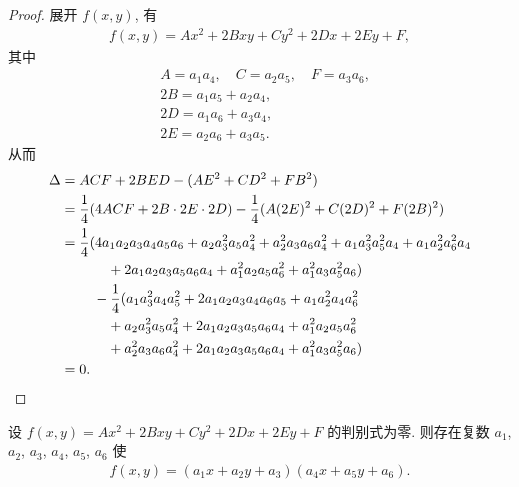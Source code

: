 \documentclass[%
    UTF8,%
    fontset=none,%
    punct=kaiming,%
    zihao=-4,%
    a4paper,%
    oneside,%
]{ctexbook}
\begin{document}
\begin{proof}
    展开 \(f(x, y)\), 有
    \begin{align*}
        f(x,y) = A x^2 + 2B xy + C y^2 + 2D x + 2E y + F,
    \end{align*}
    其中
    \begin{align*}
         & A = a_1 a_4, \quad C = a_2 a_5, \quad F = a_3 a_6, \\
         & 2B = a_1 a_5 + a_2 a_4,                            \\
         & 2D = a_1 a_6 + a_3 a_4,                            \\
         & 2E = a_2 a_6 + a_3 a_5.
    \end{align*}
    从而
    \begin{align*}
        \Delta
        = {} & ACF + 2BED - (AE^2 + CD^2 + FB^2)                                                                                        \\
        = {} & \frac{1}{4} (4ACF + 2B \cdot 2E \cdot 2D) - \frac{1}{4} (A (2E)^2 + C (2D)^2 + F(2B)^2)                                  \\
        = {} & \frac{1}{4} (4 a_1 a_2 a_3 a_4 a_5 a_6 + a_2 a_3^2 a_5 a_4^2+a_2^2 a_3 a_6 a_4^2+a_1 a_3^2 a_5^2 a_4+a_1 a_2^2 a_6^2 a_4 \\
             & \quad \quad +2 a_1 a_2 a_3 a_5 a_6 a_4+a_1^2 a_2 a_5 a_6^2+a_1^2 a_3 a_5^2 a_6)                                          \\
             & \quad - \frac{1}{4} (a_1 a_3^2 a_4 a_5^2+2 a_1 a_2 a_3 a_4 a_6 a_5+a_1 a_2^2 a_4 a_6^2                                   \\
             & \quad \quad +a_2 a_3^2 a_5 a_4^2+2 a_1 a_2 a_3 a_5 a_6 a_4+a_1^2 a_2 a_5 a_6^2                                           \\
             & \quad \quad +a_2^2 a_3 a_6 a_4^2+2 a_1 a_2 a_3 a_5 a_6 a_4+a_1^2 a_3 a_5^2 a_6)                                          \\
        = {} & 0.
        \qedhere
    \end{align*}
\end{proof}

\begin{theorem}
    设 \(f(x, y) = Ax^2 + 2Bxy + Cy^2 + 2Dx + 2Ey + F\)
    的判别式为零.
    则存在复数
    \(a_1\), \(a_2\), \(a_3\), \(a_4\), \(a_5\), \(a_6\)
    使
    \begin{align*}
        f(x, y) = (a_1 x + a_2 y + a_3) (a_4 x + a_5 y + a_6).
    \end{align*}
\end{theorem}
\end{document}
